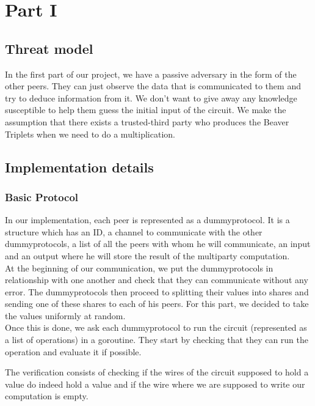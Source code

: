 \documentclass[10pt,conference,compsocconf]{IEEEtran}
\begin{document}
\section{Part I}

\subsection{Threat model}
In the first part of our project, we have a passive adversary in the form of the other peers. They can just observe the data that is communicated to them and try to deduce information from it. We don't want to give away any knowledge susceptible to help them guess the initial input of the circuit. We make the assumption that there exists a trusted-third party who produces the Beaver Triplets when we need to do a multiplication.\\

\subsection{Implementation details}
\subsubsection{Basic Protocol}

In our implementation, each peer is represented as a dummyprotocol. It is a structure which has an ID, a channel to communicate with the other dummyprotocols, a list of all the peers with whom he will communicate, an input and an output where he will store the result of the multiparty computation.\\
At the beginning of our communication, we put the dummyprotocols in relationship with one another and check that they can communicate without any error. The dummyprotocols then proceed to splitting their values into shares and sending one of these shares to each of his peers. For this part, we decided to take the values uniformly at random.\\

Once this is done, we ask each dummyprotocol to run the circuit (represented as a list of operations) in a goroutine. They start by checking that they can run the operation and evaluate it if possible.

The verification consists of checking if the wires of the circuit supposed to hold a value do indeed hold a value and if the wire where we are supposed to write our computation is empty.\\
\end{document}
